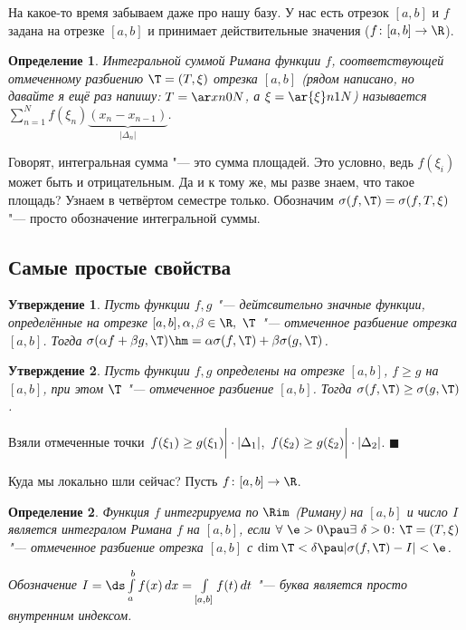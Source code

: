 \documentclass[a4paper,10pt,twoside]{article}
\newtheorem{Def}{Определение}[section]
\newtheorem{Ut}{Утверждение}[section]
\newenvironment{Proof}
       {\par\noindent{\textbf{Доказательство.}}}
       {\hfill$\scriptstyle\blacksquare$}
\begin{document}
 На какое-то время забываем даже про нашу базу. У нас есть отрезок $[a,b]$ и $f$ задана на отрезке $[a,b]$ и принимает действительные значения
 ($f\colon[a,b]\to\R$).
 \begin{Def}
 Интегральной суммой Римана функции $f$, соответствующей отмеченному разбиению $\T=(T,\xi)$ отрезка $[a,b]$ (рядом написано, но
 давайте я ещё раз напишу: $T=\ar xn0N$, а $\xi=\ar{\xi}n1N$) называется
 $\sum\limits_{n=1}^Nf(\xi_n)\underbrace{(x_n-x_{n-1})}_{|\Delta_n|}$.
 \end{Def}
 
 Говорят, интегральная сумма "--- это сумма площадей. Это условно, ведь $f(\xi_i)$ может быть и отрицательным. Да и к тому же, мы разве знаем, что
 такое площадь? Узнаем в четвёртом семестре только. Обозначим $\sigma(f,\T)=\sigma(f,T,\xi)$ "--- просто обозначение интегральной суммы.
 
 \subsection{Самые простые свойства}
 
 \begin{Ut}
 	Пусть функции $f,g$ "--- дейтсвительно значные функции, определённые на отрезке $[a,b],\alpha,\beta\in\R,\ \T$ "--- отмеченное разбиение 
 	отрезка $[a,b]$. Тогда $\sigma(\alpha f+\beta g,\T)\hm=\alpha\sigma(f,\T)+\beta\sigma(g,\T)$.
 \end{Ut} 
 
 \begin{Ut}
 	Пусть функции $f,g$ определены на отрезке $[a,b]$, $f\geq g$ на $[a,b]$, при этом $\T$ "--- отмеченное разбиение $[a,b]$. Тогда
 	$\sigma(f,\T)\geq\sigma(g,\T)$.
 \end{Ut}
 
 \begin{Proof}
 	Взяли отмеченные точки $\left.f(\xi_1)\geq g(\xi_1)\vphantom{\dfrac12}\right|\cdot|\Delta_1|$, $\left.f(\xi_2)\geq g(\xi_2)\vphantom{\dfrac13}\right|\cdot|\Delta_2|$.
 \end{Proof}
 
 Куда мы локально шли сейчас? Пусть $f\colon [a,b]\to\R$.
 
 \begin{Def}
 	Функция $f$ интегрируема по $\Rim$ (Риману) на $[a,b]$ и число $I$ является интегралом Римана $f$ на $[a,b]$, если
 	$\forall\ \e>0\pau \exists\ \delta>0\colon\T=(T,\xi)$ "--- отмеченное разбиение отрезка $[a,b]$ с $\dim\T<\delta\pau |\sigma(f,\T)-I|<\e$.
 	
 	Обозначение $I=\ds\int\limits_{a}^bf(x)\,dx=\int\limits_{[a,b]}f(t)\,dt$ "--- буква является просто внутренним индексом. 
 \end{Def}
\end{document}

